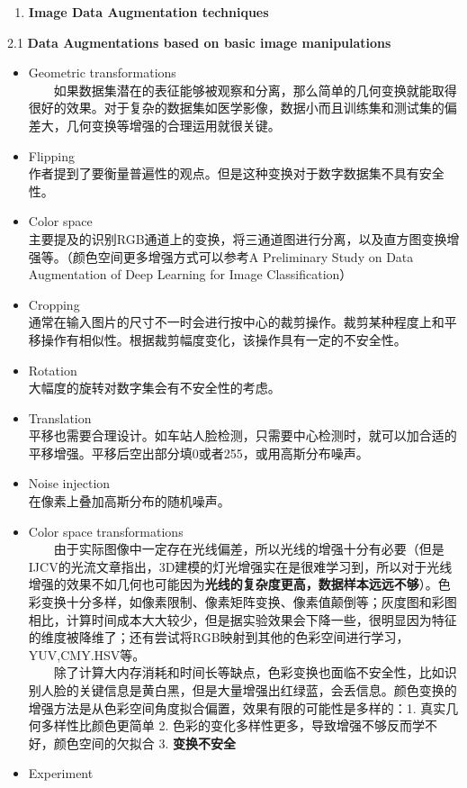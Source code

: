 \begin{figure}
\centering
\caption{}
\end{figure}

\begin{enumerate}
\def\labelenumi{\arabic{enumi}.}
\setcounter{enumi}{1}
\item
  \textbf{Image Data Augmentation techniques}
\end{enumerate}

2.1 \textbf{Data Augmentations based on basic image manipulations}

\begin{itemize}
\item
  Geometric transformations\\
    如果数据集潜在的表征能够被观察和分离，那么简单的几何变换就能取得很好的效果。对于复杂的数据集如医学影像，数据小而且训练集和测试集的偏差大，几何变换等增强的合理运用就很关键。
\item
  Flipping\\
  作者提到了要衡量普遍性的观点。但是这种变换对于数字数据集不具有安全性。
\item
  Color space\\
  主要提及的识别RGB通道上的变换，将三通道图进行分离，以及直方图变换增强等。（颜色空间更多增强方式可以参考A
  Preliminary Study on Data Augmentation of Deep Learning for Image
  Classification）
\item
  Cropping\\
  通常在输入图片的尺寸不一时会进行按中心的裁剪操作。裁剪某种程度上和平移操作有相似性。根据裁剪幅度变化，该操作具有一定的不安全性。
\item
  Rotation\\
  大幅度的旋转对数字集会有不安全性的考虑。
\item
  Translation\\
  平移也需要合理设计。如车站人脸检测，只需要中心检测时，就可以加合适的平移增强。平移后空出部分填0或者255，或用高斯分布噪声。
\item
  Noise injection\\
  在像素上叠加高斯分布的随机噪声。
\item
  Color space transformations\\
    由于实际图像中一定存在光线偏差，所以光线的增强十分有必要（但是IJCV的光流文章指出，3D建模的灯光增强实在是很难学习到，所以对于光线增强的效果不如几何也可能因为\textbf{光线的复杂度更高，数据样本远远不够}）。色彩变换十分多样，如像素限制、像素矩阵变换、像素值颠倒等；灰度图和彩图相比，计算时间成本大大较少，但是据实验效果会下降一些，很明显因为特征的维度被降维了；还有尝试将RGB映射到其他的色彩空间进行学习，YUV,CMY.HSV等。\\
    除了计算大内存消耗和时间长等缺点，色彩变换也面临不安全性，比如识别人脸的关键信息是黄白黑，但是大量增强出红绿蓝，会丢信息。颜色变换的增强方法是从色彩空间角度拟合偏置，效果有限的可能性是多样的：1.
  真实几何多样性比颜色更简单 2.
  色彩的变化多样性更多，导致增强不够反而学不好，颜色空间的欠拟合 3.
  \textbf{变换不安全}
\item
  Experiment %
\end{itemize}

